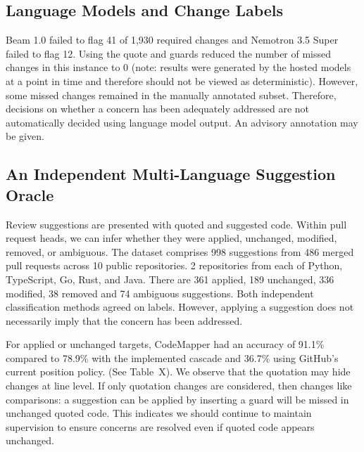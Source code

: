 \documentclass[10pt,conference,letterpaper]{IEEEtran}
\begin{document}
\subsection{Language Models and Change Labels}
Beam 1.0 failed to flag 41 of 1,930 required changes and Nemotron 3.5 Super failed to flag 12. Using the quote and guards reduced the number of missed changes in this instance to 0 (note: results were generated by the hosted models at a point in time and therefore should not be viewed as deterministic). However, some missed changes remained in the manually annotated subset. Therefore, decisions on whether a concern has been adequately addressed are not automatically decided using language model output. An advisory annotation may be given.

\subsection{An Independent Multi-Language Suggestion Oracle}
Review suggestions are presented with quoted and suggested code. Within pull request heads, we can infer whether they were applied, unchanged, modified, removed, or ambiguous. The dataset comprises 998 suggestions from 486 merged pull requests across 10 public repositories. 2 repositories from each of Python, TypeScript, Go, Rust, and Java. There are 361 applied, 189 unchanged, 336 modified, 38 removed and 74 ambiguous suggestions. Both independent classification methods agreed on labels. However, applying a suggestion does not necessarily imply that the concern has been addressed.

For applied or unchanged targets, CodeMapper had an accuracy of 91.1\% compared to 78.9\% with the implemented cascade and 36.7\% using GitHub’s current position policy. (See Table~X). We observe that the quotation may hide changes at line level. If only quotation changes are considered, then changes like comparisons: a suggestion can be applied by inserting a guard will be missed in unchanged quoted code. This indicates we should continue to maintain supervision to ensure concerns are resolved even if quoted code appears unchanged.
\end{document}
